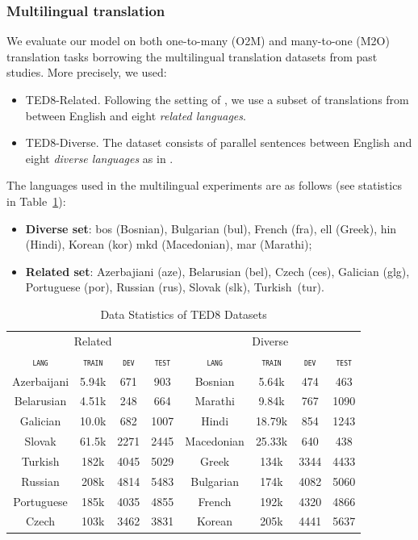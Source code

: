 \documentclass[11pt]{article}
\newcommand{\domain}[1]{\texttt{\textsc{#1}}}
\begin{document}
\subsubsection{Multilingual translation}
We evaluate our model on both one-to-many (O2M) and many-to-one (M2O)
translation tasks borrowing the multilingual translation datasets from past studies. More precisely, we used: 
\begin{itemize}
\item TED8-Related. Following the setting of \citet{Wang20balancing}, we use a subset of translations from \citet{qi18when} between English and eight \emph{related languages}.
\item TED8-Diverse. The dataset consists of parallel sentences between English and eight \emph{diverse languages} as in \citet{Wang20balancing}.
\end{itemize}

The languages used in the multilingual experiments are as follows (see statistics in Table~\ref{tab:Corpora-multilingual}):
\begin{itemize}
\item \textbf{Diverse set}: bos (Bosnian), Bulgarian (bul), French (fra), ell (Greek),
  hin (Hindi), Korean (kor) mkd (Macedonian), mar (Marathi);
\item \textbf{Related set}: Azerbajiani (aze), Belarusian (bel),
  Czech (ces), Galician (glg), Portuguese (por), Russian (rus), Slovak (slk), Turkish~(tur).
\end{itemize}

\begin{table}[h]
  \centering
  \begin{tabular}{|cccc||cccc|} 
  \hline
    \multicolumn{4}{|c||}{Related} & \multicolumn{4}{c|}{Diverse} \\
                            \multicolumn{1}{|c}{\domain{lang}} & \multicolumn{1}{c}{\domain{train}} & \multicolumn{1}{c}{\domain{dev}} & \multicolumn{1}{c||}{\domain{test}} & \multicolumn{1}{c}{\domain{lang}} & \multicolumn{1}{c}{\domain{train}} & \multicolumn{1}{c}{\domain{dev}} & \multicolumn{1}{c|}{\domain{test}} \\
    \hline 
    Azerbaijani & 5.94k & 671 & 903 & Bosnian & 5.64k & 474 & 463 \\
    Belarusian & 4.51k & 248 & 664 & Marathi & 9.84k & 767 & 1090\\
    Galician & 10.0k & 682 & 1007 & Hindi & 18.79k & 854 & 1243\\
    Slovak & 61.5k & 2271 & 2445 & Macedonian & 25.33k & 640 & 438 \\
    Turkish & 182k & 4045 & 5029 & Greek & 134k & 3344 & 4433\\
    Russian & 208k & 4814 & 5483 &  Bulgarian & 174k & 4082 & 5060 \\
    Portuguese & 185k & 4035 & 4855 & French & 192k & 4320 & 4866\\
    Czech & 103k & 3462 & 3831 & Korean & 205k & 4441 & 5637 \\
    \hline
  \end{tabular}
  \caption{Data Statistics of TED8 Datasets}
\label{tab:Corpora-multilingual}
\end{table}
\end{document}
